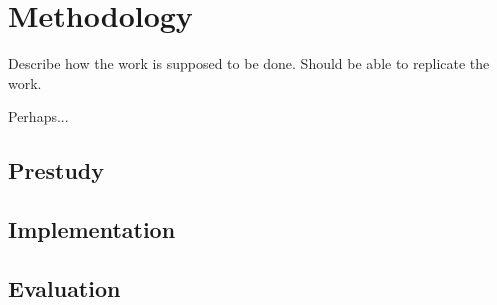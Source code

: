 \chapter{Methodology}\label{cha:method}

Describe how the work is supposed to be done. Should be able to replicate the work.

Perhaps...

\section{Prestudy}\label{sec:prestudy}

\section{Implementation}\label{sec:implementation}

\section{Evaluation}\label{sec:evaluation}
